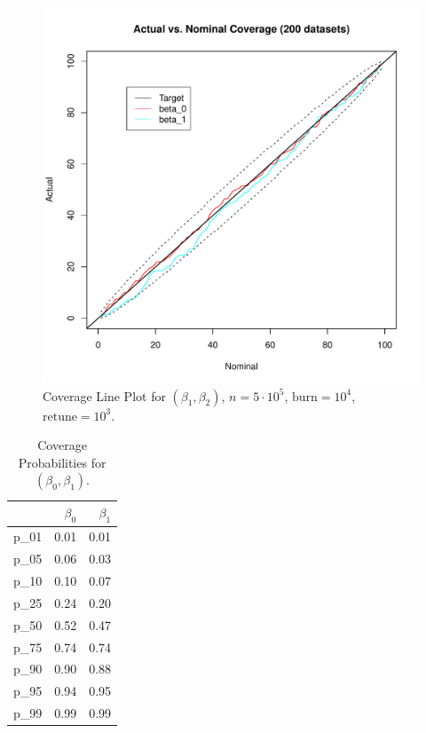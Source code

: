 \documentclass[12pt]{article}
\begin{document}
\begin{figure}[H] \center
\includegraphics[scale=.65]{coverage_line_plot.pdf}
\caption*{Coverage Line Plot for $(\beta_1, \beta_2)$, $n=5 \cdot 10^5$, $\text{burn}=10^4$, $\text{retune}=10^3$.}
\end{figure}

\begin{table}[H] \center
\begin{tabular}{rrr} \hline
& $\beta_0$ & $\beta_1$ \\ \hline
p\_01 & 0.01 & 0.01 \\ 
p\_05 & 0.06 & 0.03 \\ 
p\_10 & 0.10 & 0.07 \\ 
p\_25 & 0.24 & 0.20 \\ 
p\_50 & 0.52 & 0.47 \\ 
p\_75 & 0.74 & 0.74 \\ 
p\_90 & 0.90 & 0.88 \\ 
p\_95 & 0.94 & 0.95 \\ 
p\_99 & 0.99 & 0.99 \\ \hline
\end{tabular}
\caption*{Coverage Probabilities for $(\beta_0, \beta_1)$.}
\end{table}
\end{document}
